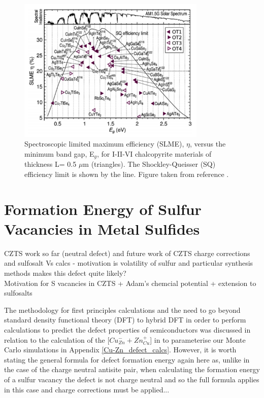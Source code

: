 \begin{figure}[h!]
  \centering
    \includegraphics[width=0.8\textwidth]{figures/SLME.png}
    \caption{Spectroscopic limited maximum efficiency (SLME), $\eta$, versus the minimum band gap, E$_g$, for I-II-VI chalcopyrite materials of thickness L= 0.5 $\mu$m (triangles). The Shockley-Queisser (SQ) efficiency limit is shown by the line. Figure taken from reference .}
  \label{SLME}
\end{figure}



\section{Formation Energy of Sulfur Vacancies in Metal Sulfides}\label{Vs_proj}
CZTS work so far (neutral defect) and future work of CZTS charge corrections and sulfosalt Vs calcs - motivation is volatility of sulfur and particular synthesis methods makes this defect quite likely?\\

Motivation for S vacancies in CZTS + Adam's chemcial potential + extension to sulfosalts

The methodology for first principles calculations and the need to go beyond standard density functional theory (DFT) to hybrid DFT in order to perform calculations to predict the defect properties of semiconductors was discussed in relation to the calculation of the [$Cu_{Zn}^- + Zn_{Cu}^+$] in {\CZTS} to parameterise our Monte Carlo simulations in Appendix \ref{Cu-Zn_defect_calcs}. However, it is worth stating the general formula for defect formation energy again here as, unlike in the case of the charge neutral antisite pair, when calculating the formation energy of a sulfur vacancy the defect is not charge neutral and so the full formula applies in this case and charge corrections must be applied...




